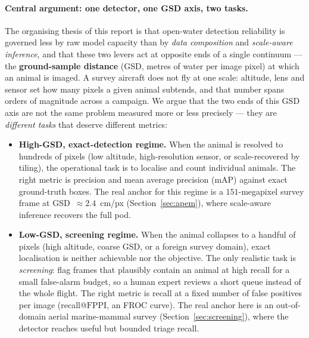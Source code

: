 \documentclass[11pt,a4paper]{article}
\newcommand{\map}{mAP}
\newcommand{\fppi}{\text{FPPI}}
\begin{document}
\paragraph{Central argument: one detector, one GSD axis, two tasks.}
The organising thesis of this report is that open-water detection reliability
is governed less by raw model capacity than by \emph{data composition} and
\emph{scale-aware inference}, and that these two levers act at opposite ends of
a single continuum --- the \textbf{ground-sample distance} (GSD, metres of
water per image pixel) at which an animal is imaged. A survey aircraft does not
fly at one scale: altitude, lens and sensor set how many pixels a given animal
subtends, and that number spans orders of magnitude across a campaign. We argue
that the two ends of this GSD axis are not the same problem measured more or
less precisely --- they are \emph{different tasks} that deserve different
metrics:
\begin{itemize}[itemsep=2pt,topsep=2pt]
  \item \textbf{High-GSD, exact-detection regime.} When the animal is resolved
  to hundreds of pixels (low altitude, high-resolution sensor, or
  scale-recovered by tiling), the operational task is to localise and count
  individual animals. The right metric is precision and mean average precision
  (\map) against exact ground-truth boxes. The real anchor for this regime is a
  $151$-megapixel survey frame at GSD~$\approx\!2.4$~cm/px
  (Section~\ref{sec:apem}), where scale-aware inference recovers the full pod.
  \item \textbf{Low-GSD, screening regime.} When the animal collapses to a
  handful of pixels (high altitude, coarse GSD, or a foreign survey domain),
  exact localisation is neither achievable nor the objective. The only realistic task
  is \emph{screening}: flag frames that plausibly contain an animal at high
  recall for a small false-alarm budget, so a human expert reviews a short
  queue instead of the whole flight. The right metric is recall at a fixed
  number of false positives per image (recall@$\fppi$, an FROC curve). The real
  anchor here is an out-of-domain aerial marine-mammal survey
  (Section~\ref{sec:screening}), where the detector reaches useful but bounded
  triage recall.
\end{itemize}
\end{document}
